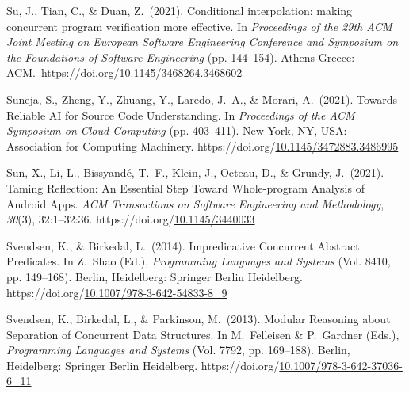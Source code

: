 \documentclass[12pt,twoside]{article}
\begin{document}
{\begin{thebibliography}{1079}
\mdbibitemlabel{}Su, J., Tian, C., \& Duan, Z.~(2021). Conditional interpolation: making concurrent program verification more effective. In \emph{Proceedings of the 29th ACM Joint Meeting on European Software Engineering Conference and Symposium on the Foundations of Software Engineering} (pp. 144–154). Athens Greece: ACM.~https://doi.org/\href{https://dx.doi.org/10.1145/3468264.3468602}{10.1145/3468264.3468602}%

\mdbibitemlabel{}Suneja, S., Zheng, Y., Zhuang, Y., Laredo, J.~A., \& Morari, A.~(2021). Towards Reliable AI for Source Code Understanding. In \emph{Proceedings of the ACM Symposium on Cloud Computing} (pp. 403–411). New York, NY, USA: Association for Computing Machinery. https://doi.org/\href{https://dx.doi.org/10.1145/3472883.3486995}{10.1145/3472883.3486995}%

\mdbibitemlabel{}Sun, X., Li, L., Bissyandé, T.~F., Klein, J., Octeau, D., \& Grundy, J.~(2021). Taming Reflection: An Essential Step Toward Whole-program Analysis of Android Apps. \emph{ACM Transactions on Software Engineering and Methodology}, \emph{30}(3), 32:1–32:36. https://doi.org/\href{https://dx.doi.org/10.1145/3440033}{10.1145/3440033}%

\mdbibitemlabel{}Svendsen, K., \& Birkedal, L.~(2014). Impredicative Concurrent Abstract Predicates. In Z.~Shao (Ed.), \emph{Programming Languages and Systems} (Vol. 8410, pp. 149–168). Berlin, Heidelberg: Springer Berlin Heidelberg. https://doi.org/\href{https://dx.doi.org/10.1007/978-3-642-54833-8_9}{10.1007/978-3-642-54833-8\_9}%

\mdbibitemlabel{}Svendsen, K., Birkedal, L., \& Parkinson, M.~(2013). Modular Reasoning about Separation of Concurrent Data Structures. In M.~Felleisen \& P.~Gardner (Eds.), \emph{Programming Languages and Systems} (Vol. 7792, pp. 169–188). Berlin, Heidelberg: Springer Berlin Heidelberg. https://doi.org/\href{https://dx.doi.org/10.1007/978-3-642-37036-6_11}{10.1007/978-3-642-37036-6\_11}%


\end{thebibliography}}
\end{document}
